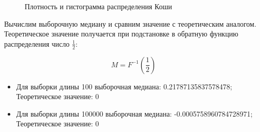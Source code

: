 \documentclass{article}
\begin{document}
\begin{figure}[h]
\caption{Плотность и гистограмма распределения Коши}
\label{fig:image}
\end{figure}

Вычислим выборочную медиану и сравним значение с теоретическим аналогом. Теоретическое значение
получается при подстановке в обратную функцию распределения число $\frac{1}{2}$:

\[M = F^{-1}(\frac{1}{2})\]

\begin{itemize}
    \item Для выборки длины 100 выборочная медиана: 0.21787135837578478; Теоретическое значение: 0
    \item Для выборки длины 100000 выборочная медиана: -0.0005758960784728971; Теоретическое значение: 0
\end{itemize}
\end{document}
